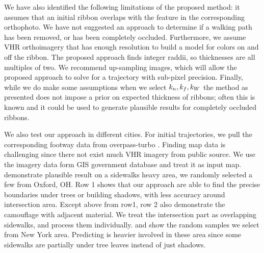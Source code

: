 We have also identified the following limitations of the proposed method: it assumes that an initial ribbon overlaps with the feature in the corresponding orthophoto. 
We have not suggested an approach to determine if a walking path has been removed, or has been completely occluded. Furthermore, we assume \ac{VHR} orthoimagery that has enough resolution to build a model for colors on and off the ribbon. 
The proposed approach finds integer raddii, so thicknesses are all multiples of two. 
We recommend up-sampling images, which will allow the proposed approach to solve for a trajectory with sub-pixel precision. 
Finally, while we do make some assumptions when we select $k_n{}, k_f{}, k_W{}$ the method as presented does not impose a prior on expected thickness of ribbons; often this is known and it could be used to generate plausible results for completely occluded ribbons.

We also test our approach in different cities. 
For initial trajectories, we pull the corresponding footway data from overpass-turbo \cite{overpass_turbo}.
Finding map data is challenging since there not exist much \ac{VHR} imagery from public source. 
We use the imagery data form GIS government database and treat it as input map. 
 demonstrate plausible result on a sidewalks heavy area, we randomly selected a few from Oxford, OH. 
Row 1 shows that our approach are able to find the precise boundaries under trees or building shadows, with less accuracy around intersection area. 
Except above from row1, row 2 also demonstrate the camouflage with adjacent material. 
We treat the intersection part as overlapping sidewalks, and process them individually.  and  show the random samples we select from New York area. 
Predicting is heavier involved in these area since some sidewalks are partially under tree leaves instead of just shadows. 



